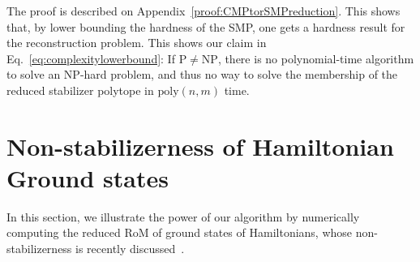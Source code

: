 \documentclass[10pt,aps,pra,twocolumn,floatfix,nofootinbib,superscriptaddress,longbibliography]{revtex4-2}
\newcommand{\1}{\mathbbm{1}}
\begin{document}
The proof is described on Appendix~\ref{proof:CMPtorSMPreduction}. This shows that, by lower bounding the hardness of the SMP, one gets a hardness result for the reconstruction problem. This shows our claim in Eq.~\eqref{eq:complexitylowerbound}: If $\mathrm{P} \neq \mathrm{NP}$, there is no polynomial-time algorithm to solve an $\mathrm{NP}$-hard problem, and thus no way to solve the membership of the reduced stabilizer polytope in $\mathrm{poly}(n,m)$ time.






\section{Non-stabilizerness of Hamiltonian Ground states \label{sec:hamilton}}


In this section, we illustrate the power of our algorithm by numerically computing the reduced RoM of ground states of Hamiltonians, whose non-stabilizerness is recently discussed~\cite{oliviero2022magic, frau2024nonstabilizerness, timsina2025robustness}.
\end{document}
